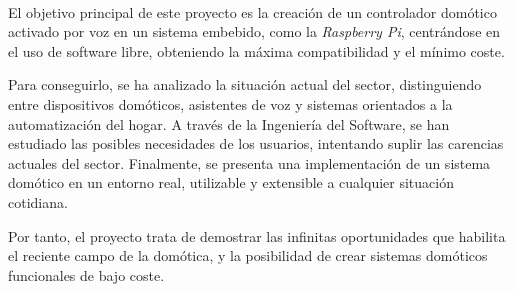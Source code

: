 \chapter*{}




\cleardoublepage
\thispagestyle{empty}

\begin{center}
{\large\bfseries \myTitleES}\\
\end{center}
\begin{center}
\myName\\
\end{center}

\\

\vspace{0.7cm}
\\

El objetivo principal de este proyecto es la creación de un controlador domótico activado por voz en un sistema embebido,
como la \textit{Raspberry Pi}, centrándose en el uso de software libre, obteniendo la máxima compatibilidad y el mínimo
coste.

\bigskip
Para conseguirlo, se ha analizado la situación actual del sector, distinguiendo entre dispositivos domóticos,
asistentes de voz y sistemas orientados a la automatización del hogar. A través de la Ingeniería del Software, se han estudiado
las posibles necesidades de los usuarios, intentando suplir las carencias actuales del sector. Finalmente, se presenta una
implementación de un sistema domótico en un entorno real, utilizable y extensible a cualquier situación cotidiana.

\bigskip
Por tanto, el proyecto trata de demostrar las infinitas oportunidades que habilita el reciente campo de la domótica, y la 
posibilidad de crear sistemas domóticos funcionales de bajo coste.

\cleardoublepage


\thispagestyle{empty}


\begin{center}
{\large\bfseries \myTitle}\\
\end{center}
\begin{center}
\myName\\
\end{center}

